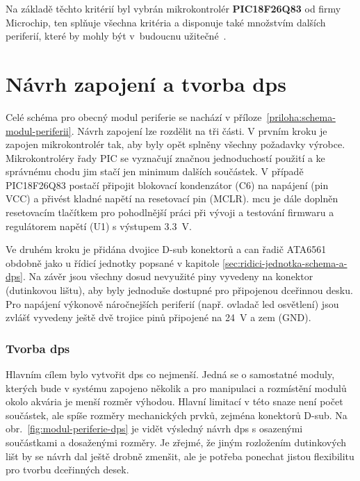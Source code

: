         Na základě těchto kritérií byl vybrán mikrokontrolér \textbf{PIC18F26Q83} od firmy Microchip, ten splňuje všechna kritéria a disponuje také množstvím dalších periferií, které by mohly být v~budoucnu užitečné~\cite{PIC18F26Q83}.

    \section{Návrh zapojení a tvorba \acs{dps}}
        Celé schéma pro obecný modul periferie se nachází v příloze~\ref{priloha:schema-modul-periferii}. Návrh zapojení lze rozdělit na tři části. V prvním kroku je zapojen mikrokontrolér tak, aby byly opět splněny všechny požadavky výrobce. Mikrokontroléry řady PIC se vyznačují značnou jednoduchostí použití a ke správnému chodu jim stačí jen minimum dalších součástek. V případě PIC18F26Q83 postačí připojit blokovací kondenzátor (C6) na napájení (pin VCC) a přivést kladné napětí na resetovací pin (MCLR). \acs{mcu} je dále doplněn resetovacím tlačítkem pro pohodlnější práci při vývoji a testování firmwaru a regulátorem napětí (U1) s výstupem \qty{3.3}{V}. 

        Ve druhém kroku je přidána dvojice D-sub konektorů a \acs{can} řadič ATA6561 obdobně jako u řídicí jednotky popsané v kapitole \ref{sec:ridici-jednotka-schema-a-dps}. Na závěr jsou všechny dosud nevyužité piny vyvedeny na konektor (dutinkovou lištu), aby byly jednoduše dostupné pro připojenou dceřinnou desku. Pro napájení výkonově náročnejších periferií (např. ovladač \acs{led} osvětlení) jsou zvlášť vyvedeny ještě dvě trojice pinů připojené na \qty{24}{V} a zem (GND).

        \subsubsection{Tvorba \acs{dps}}
        Hlavním cílem bylo vytvořit \acs{dps} co nejmenší. Jedná se o samostatné moduly, kterých bude v systému zapojeno několik a pro manipulaci a rozmístění modulů okolo akvária je menší rozměr výhodou. Hlavní limitací v této snaze není počet součástek, ale spíše rozměry mechanických prvků, zejména konektorů D-sub. Na obr.~\ref{fig:modul-periferie-dps} je vidět výsledný návrh \acs{dps} s osazenými součástkami a dosaženými rozměry. Je zřejmé, že jiným rozložením dutinkových lišt by se návrh dal ještě drobně zmenšit, ale je potřeba ponechat jistou flexibilitu pro tvorbu dceřinných desek.

